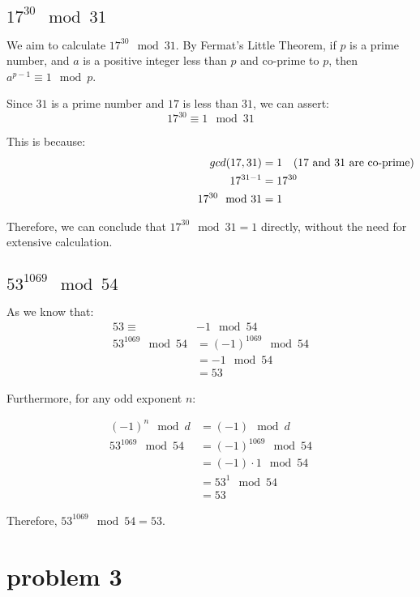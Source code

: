 \documentclass[9pt]{article}
\begin{document}
\begin{CJK*}{UTF8}{gbsn}
\subsection{ $17^{30} \mod  31$}

We aim to calculate \(17^{30} \mod 31\). By Fermat's Little Theorem, if \(p\) is a prime number, and \(a\) is a positive integer less than \(p\) and co-prime to \(p\), then \(a^{p-1} \equiv 1 \mod p\).

Since \(31\) is a prime number and \(17\) is less than \(31\), we can assert:
\begin{equation*}
17^{30} \equiv 1 \mod 31
\end{equation*}

This is because:
\begin{align*}
gcd(17, 31) &= 1 \quad \text{(17 and 31 are co-prime)} \\
17^{31-1} &= 17^{30} \\
\hspace*{6 cm} 17^{30} \mod 31 &= 1
\end{align*}

Therefore, we can conclude that \(17^{30} \mod 31 = 1\) directly, without the need for extensive calculation.

\subsection{ $53^{1069} \mod 54$}

As we know that:
\begin{align*}
53 \equiv &-1 \mod 54 \\
53^{1069} \mod 54 &= (-1)^{1069} \mod 54 \\
&= -1 \mod 54 \\
&= 53
\end{align*}

Furthermore, for any odd exponent \( n \):

\begin{align*}
(-1)^n \mod d &= (-1) \mod d \\
53^{1069} \mod 54 &= (-1)^{1069} \mod 54 \\
&= (-1) \cdot 1 \mod 54 \\
&= 53^{1} \mod 54 \\
&= 53
\end{align*}

Therefore, \(53^{1069} \mod 54 = 53\).

\newpage

\section{problem 3}


\end{CJK*}
\end{document}

